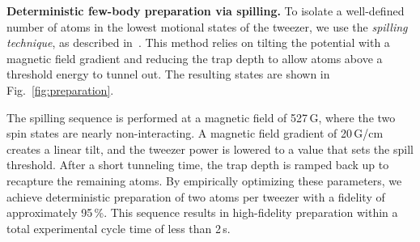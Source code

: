 \textbf{Deterministic few-body preparation via spilling.} To isolate a well-defined number of atoms in the lowest motional states of the tweezer, we use the \emph{spilling technique}, as described in~\cite{zurn_few-fermion_2012, holten_pauli_2022}. This method relies on tilting the potential with a magnetic field gradient and reducing the trap depth to allow atoms above a threshold energy to tunnel out. 
The resulting states are shown in Fig.~\ref{fig:preparation}. 

The spilling sequence is performed at a magnetic field of 527\,G, where the two spin states are nearly non-interacting. A magnetic field gradient of 20\,G/cm creates a linear tilt, and the tweezer power is lowered to a value that sets the spill threshold. After a short tunneling time, the trap depth is ramped back up to recapture the remaining atoms. By empirically optimizing these parameters, we achieve deterministic preparation of two atoms per tweezer with a fidelity of approximately 95\,\%. This sequence results in high-fidelity preparation within a total experimental cycle time of less than 2\,s.



